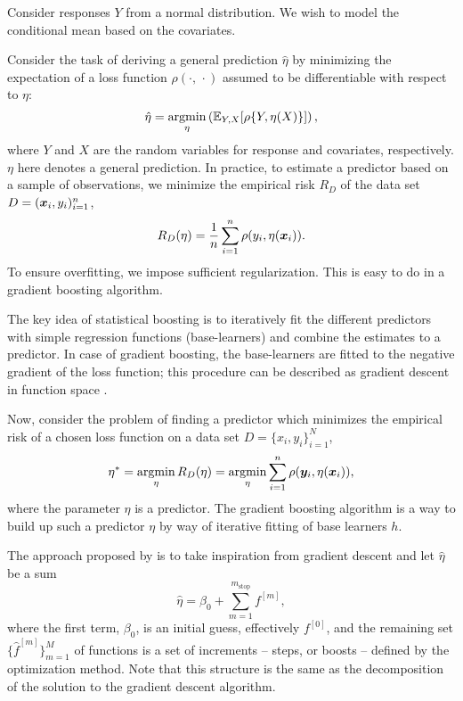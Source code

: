 Consider responses $Y$ from a normal distribution. We wish to model the conditional mean based on the covariates.

Consider the task of deriving a general prediction $\hat{\eta}$ by minimizing the expectation of a loss function $\rho(\cdot,\,\cdot)$
assumed to be differentiable with respect to $\eta$:
\begin{equation}\label{eq:min}
    \hat{\eta}=\operatorname*{argmin}_\eta\left(\mathbb{E}_{Y,X}[\rho\{Y,\eta(X)\}]\right),
\end{equation}
where $Y$ and $X$ are the random variables for response and covariates, respectively. $\eta$ here denotes a general prediction.
In practice, to estimate a predictor based on a sample of observations, we minimize the empirical risk $R_D$ of the data set
$D=(\bm{x}_i,y_i)_{i=1}^n$,
\begin{equation}
    R_D(\eta)=\frac{1}{n}\sum_{i=1}^n \rho(y_i,\eta(\bm{x}_i)).
\end{equation}
To ensure overfitting, we impose sufficient regularization. This is easy to do in a gradient boosting algorithm.

The key idea of statistical boosting is to iteratively fit the different predictors with simple regression functions (base-learners) and combine the estimates to a predictor. In case of gradient boosting, the base-learners are fitted to the negative gradient of the loss function; this procedure can be described as gradient descent in function space \citep{buhlmann2007}.

Now, consider the problem of finding a predictor which minimizes the empirical risk of a chosen loss function on a data set
$D=\{x_i,y_i\}_{i=1}^N$,
\begin{equation}\label{eq:argmin-eta}
    \eta^*=\operatorname*{argmin}_{\eta}R_D(\eta)=\operatorname*{argmin}_{\eta}\sum_{i=1}^n\rho(\bm{y}_i,\eta(\bm{x}_i)),
\end{equation}
where the parameter $\eta$ is a predictor.
The gradient boosting algorithm is a way to build up such a predictor $\eta$ by way of iterative fitting of base learners $h$.

The approach proposed by \citet{friedman2001} is to take inspiration from gradient descent and let $\hat{\eta}$ be a sum
\begin{equation}
    \hat{\eta}=\beta_0+\sum_{m=1}^{m_{\text{stop}}}f^{[m]},
\end{equation}
where the first term, $\beta_0$, is an initial guess, effectively $f^{[0]}$, and the remaining set $\{\hat{f}^{[m]}\}_{m=1}^M$ of 
functions is a set of increments -- steps, or boosts -- defined by the optimization method. Note that this structure
is the same as the decomposition of the solution to the gradient descent algorithm.

